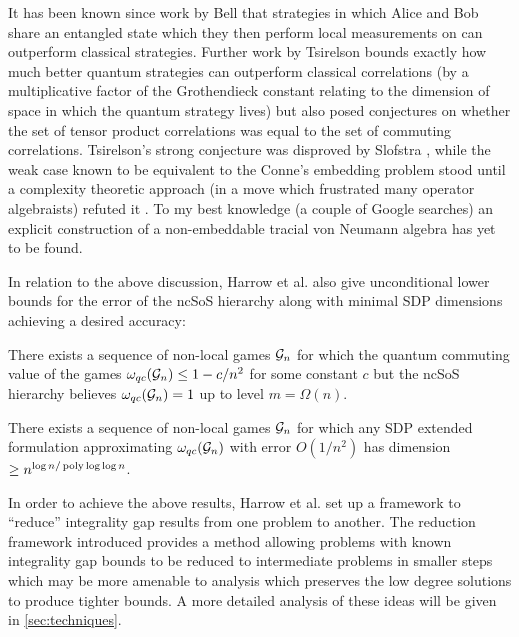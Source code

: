 \documentclass[runningheads,a4paper,english]{llncs}[2022/01/12]
\begin{document}
It has been known since work by Bell \cite{PhysicsPhysiqueFizika.1.195} that strategies in which Alice and Bob share an entangled state which they then perform local measurements on can outperform classical strategies.
Further work by Tsirelson \cite{tsirelson1993some} bounds exactly how much better quantum strategies can outperform classical correlations (by a multiplicative factor of the Grothendieck constant relating to the dimension of space in which the quantum strategy lives) but also posed conjectures on whether the set of tensor product correlations was equal to the set of commuting correlations.
Tsirelson's strong conjecture was disproved by Slofstra \cite{Slofstra_2019}, while the weak case known to be equivalent to the Conne's embedding problem \cite{MR2790067} stood until a complexity theoretic approach (in a move which frustrated many operator algebraists) refuted it \cite{ji2021mip}. To my best knowledge (a couple of Google searches) an explicit construction of a non-embeddable tracial von Neumann algebra has yet to be found.

In relation to the above discussion, Harrow et al. also give unconditional lower bounds for the error of the ncSoS hierarchy along with minimal SDP dimensions achieving a desired accuracy:

\begin{theorem}\label{thm:3}
  There exists a sequence of non-local games $\mathcal{G}_n$ for which the quantum commuting value of the games $\omega_{qc}(\mathcal{G}_n) \le 1 - c/n^2$ for some constant $c$ but the ncSoS hierarchy believes $\omega_{qc}(\mathcal{G}_n) = 1$ up to level $m = \Omega(n)$.
\end{theorem}

\begin{theorem}\label{thm:4}
  There exists a sequence of non-local games $\mathcal{G}_n$ for which any SDP extended formulation approximating $\omega_{qc}(\mathcal{G}_n)$ with error $O(1/n^2)$ has dimension $\ge n^{\log n/\operatorname{poly} \log \log n}$.
\end{theorem}

In order to achieve the above results, Harrow et al. set up a framework to ``reduce'' integrality gap results from one problem to another.
The reduction framework introduced provides a method allowing problems with known integrality gap bounds to be reduced to intermediate problems in smaller steps which may be more amenable to analysis which preserves the low degree solutions to produce tighter bounds.
A more detailed analysis of these ideas will be given in \cref{sec:techniques}.
\end{document}
